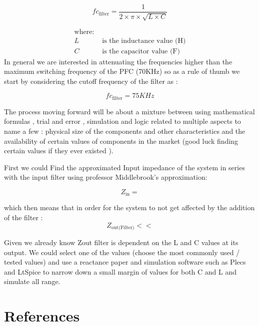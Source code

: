 \documentclass{article}
\begin{document}
\[
fc_{\text{filter}} =  \frac{1}{2\times\pi\times\sqrt{L\times C}}
\]

\begin{align*}
\text{where:} \\
 L &\text{ is the inductance value (H)} \\
 C &\text{ is the capacitor value (F}\text{)}
\end{align*}
In general we are interested in attenuating the frequencies higher than the maximum switching frequency of the PFC (70KHz) so as a rule of thumb we start by considering the cutoff frequency of the filter as :

\[
fc_{\text{filter}} =  75 KHz
\]

The process moving forward will be about a mixture between using mathematical formulas , trial and error , simulation and logic related to multiple aspects to name a few : physical size of the components and other characteristics and the availability of certain values of components in the market (good luck finding certain values if they ever existed ).

First we could Find the approximated Input impedance of the system in series with the input filter using professor Middlebrook's approximation:

\[
Z_{\text{in}} =  
\]

which then means that in order for the system to not get affected by the addition of the filter : 
\[Z_{\text{out(Filter)}} << \]

Given we already know Zout filter is dependent on the L and C values at its output. We could select one of the values (choose the most commonly used / tested values) and use a reactance paper and simulation software such as Plecs and LtSpice to narrow down a small margin of values for both C and L and simulate all range.





\section{References}
\end{document}
